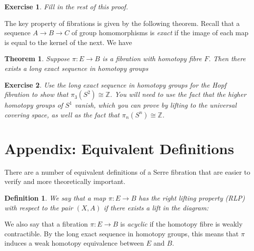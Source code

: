 \documentclass[11pt]{article}
\newtheorem{theorem}{Theorem}
\newtheorem{exercise}{Exercise}
\newtheorem{definition}{Definition}
\begin{document}
\begin{exercise}
Fill in the rest of this proof.
\end{exercise}

The key property of fibrations is given by the following theorem. Recall that a sequence $A \to B \to C$ of group homomorphisms is \textit{exact} if the image of each map is equal to the kernel of the next. We have
\begin{theorem}
Suppose $\pi: E \to B$ is a fibration with homotopy fibre $F$. Then there exists a long exact sequence in homotopy groups
\begin{center}
\end{center}
\end{theorem}

\begin{exercise}
Use the long exact sequence in homotopy groups for the Hopf fibration to show that $\pi_3(S^2) \cong \mathbb{Z}$. You will need to use the fact that the higher homotopy groups of $S^1$ vanish, which you can prove by lifting to the universal covering space, as well as the fact that $\pi_n(S^n) \cong \mathbb{Z}$.
\end{exercise}

\section*{Appendix: Equivalent Definitions}

There are a number of equivalent definitions of a Serre fibration that are easier to verify and more theoretically important.

\begin{definition}
We say that a map $\pi: E \to B$ has the right lifting property (RLP) with respect to the pair $(X,A)$ if there exists a lift in the diagram:
\begin{center}
\end{center}
\end{definition}

We also say that a fibration $\pi: E \to B$ is \textit{acyclic} if the homotopy fibre is weakly contractible. By the long exact sequence in homotopy groups, this means that $\pi$ induces a weak homotopy equivalence between $E$ and $B$.
\end{document}
